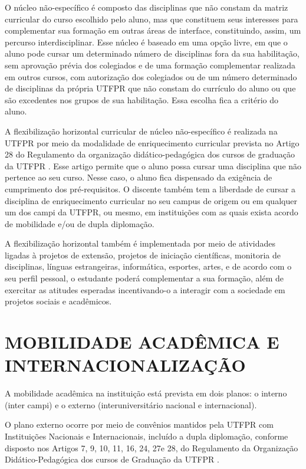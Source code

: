 
O núcleo não-específico é composto das disciplinas que não constam da matriz curricular do curso escolhido pelo aluno, mas que constituem seus interesses para complementar sua formação em outras áreas de interface, constituindo, assim, um percurso interdisciplinar. Esse núcleo é baseado em uma opção livre, em que o aluno pode cursar um determinado número de disciplinas fora da sua habilitação, sem aprovação prévia dos colegiados e de uma formação complementar realizada em outros cursos, com autorização dos colegiados ou de um número determinado de disciplinas da própria UTFPR que não constam do currículo do aluno ou que são excedentes nos grupos de sua habilitação. Essa escolha fica a critério do aluno. 

A flexibilização horizontal curricular de núcleo não-específico é realizada na UTFPR por meio da modalidade de enriquecimento curricular prevista no Artigo 28 do Regulamento da organização didático-pedagógica dos cursos de graduação da UTFPR \cite{rodp}. Esse artigo permite que o aluno possa cursar uma disciplina que não pertence ao seu curso. Nesse caso, o aluno fica dispensado da exigência de cumprimento dos pré-requisitos. O discente também tem a liberdade de cursar a disciplina de enriquecimento curricular no seu campus de origem ou em qualquer um dos campi da UTFPR, ou mesmo, em instituições com as quais exista acordo de mobilidade e/ou de dupla diplomação.

A flexibilização horizontal também é implementada por meio de atividades ligadas à projetos de extensão, projetos de iniciação científicas, monitoria de disciplinas, línguas estrangeiras, informática, esportes, artes, e de acordo com o seu perfil pessoal, o estudante poderá complementar a sua formação, além de exercitar as atitudes esperadas incentivando-o a interagir com a sociedade em projetos sociais e acadêmicos.

\section{MOBILIDADE ACADÊMICA E INTERNACIONALIZAÇÃO}
\label{sec:mobi}

A mobilidade acadêmica na instituição está prevista em dois planos: o interno (inter campi) e o externo (interuniversitário nacional e internacional).

O plano externo ocorre por meio de convênios mantidos pela UTFPR com Instituições Nacionais e Internacionais, incluído a dupla diplomação, conforme disposto nos Artigos 7\textordmasculine, 9\textordmasculine, 10\textordmasculine, 11\textordmasculine, 16\textordmasculine, 24\textordmasculine, 27\textordmasculine e 28\textordmasculine, do Regulamento da Organização Didático-Pedagógica dos cursos de Graduação da UTFPR \cite{rodp}.

